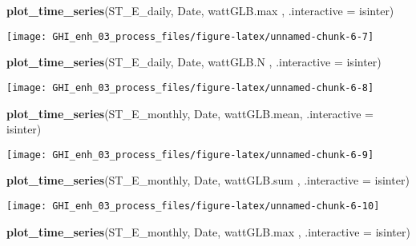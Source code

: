 \documentclass[
  10pt,
  a4paper,oneside]{article}
\newenvironment{Shaded}{\begin{snugshade}}{\end{snugshade}}
\newcommand{\AttributeTok}[1]{\textcolor[rgb]{0.13,0.29,0.53}{#1}}
\newcommand{\FunctionTok}[1]{\textcolor[rgb]{0.13,0.29,0.53}{\textbf{#1}}}
\newcommand{\NormalTok}[1]{#1}
\begin{document}
\begin{Shaded}
\begin{Highlighting}[]
\FunctionTok{plot\_time\_series}\NormalTok{(ST\_E\_daily, Date, wattGLB.max , }\AttributeTok{.interactive =}\NormalTok{ isinter)}
\end{Highlighting}
\end{Shaded}

\begin{center}\texttt{[image: GHI\_enh\_03\_process\_files/figure-latex/unnamed-chunk-6-7]} \end{center}

\begin{Shaded}
\begin{Highlighting}[]
\FunctionTok{plot\_time\_series}\NormalTok{(ST\_E\_daily, Date, wattGLB.N   , }\AttributeTok{.interactive =}\NormalTok{ isinter)}
\end{Highlighting}
\end{Shaded}

\begin{center}\texttt{[image: GHI\_enh\_03\_process\_files/figure-latex/unnamed-chunk-6-8]} \end{center}

\begin{Shaded}
\begin{Highlighting}[]
\FunctionTok{plot\_time\_series}\NormalTok{(ST\_E\_monthly, Date, wattGLB.mean, }\AttributeTok{.interactive =}\NormalTok{ isinter)}
\end{Highlighting}
\end{Shaded}

\begin{center}\texttt{[image: GHI\_enh\_03\_process\_files/figure-latex/unnamed-chunk-6-9]} \end{center}

\begin{Shaded}
\begin{Highlighting}[]
\FunctionTok{plot\_time\_series}\NormalTok{(ST\_E\_monthly, Date, wattGLB.sum , }\AttributeTok{.interactive =}\NormalTok{ isinter)}
\end{Highlighting}
\end{Shaded}

\begin{center}\texttt{[image: GHI\_enh\_03\_process\_files/figure-latex/unnamed-chunk-6-10]} \end{center}

\begin{Shaded}
\begin{Highlighting}[]
\FunctionTok{plot\_time\_series}\NormalTok{(ST\_E\_monthly, Date, wattGLB.max , }\AttributeTok{.interactive =}\NormalTok{ isinter)}
\end{Highlighting}
\end{Shaded}
\end{document}
